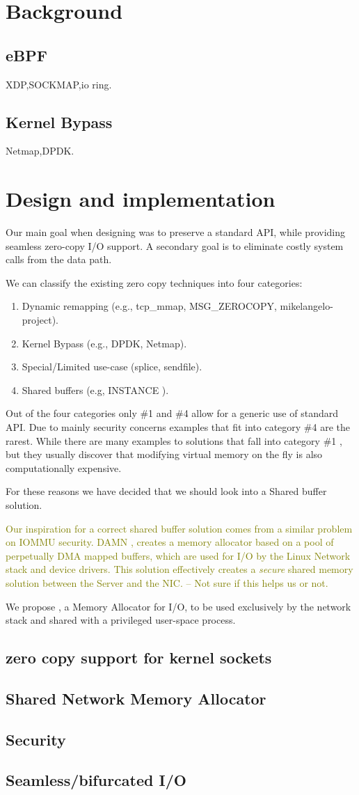\section{Background}
\subsection{eBPF}
XDP,SOCKMAP,io ring.
\subsection{Kernel Bypass}
Netmap,DPDK.

\section{Design and implementation}
Our main goal when designing \oursys was to preserve a standard \sockets API, while providing seamless zero-copy I/O support. A secondary goal is to eliminate costly system calls from the data path. 

We can classify the existing zero copy techniques into four categories:
\begin{enumerate}
    \item Dynamic remapping (e.g., tcp\_mmap, MSG\_ZEROCOPY, mikelangelo-project\cite{mikelangelo}).
    \item Kernel Bypass (e.g., DPDK, Netmap).
    \item Special/Limited use-case (splice, sendfile).
    \item Shared buffers (e.g, INSTANCE \cite{instance}).
\end{enumerate}
Out of the four categories only \#1 and \#4 allow for a generic use of standard \sockets API. Due to mainly security concerns examples that fit into category \#4 are the rarest.
While there are many examples to solutions that fall into category \#1 \cite{mikelangelo-empty,desendmsg}, but they usually discover that modifying virtual memory on the fly is also computationally expensive. 

For these reasons we have decided that we should look into a Shared buffer solution. 

\textcolor{olive}{
Our inspiration for a correct shared buffer solution comes from a similar problem on IOMMU security. DAMN \cite{markuze2018damn}, creates a memory allocator based on a pool of perpetually DMA mapped buffers, which are used for I/O by the Linux Network stack and device drivers. This solution effectively creates a \emph{secure} shared memory solution between the Server and the NIC. -- Not sure if this helps us or not.} 

We propose \oursys, a Memory Allocator for I/O, to be used exclusively by the network stack and shared with a privileged user-space process.  

\subsection{zero copy support for kernel sockets}
\subsection{Shared Network Memory Allocator}
\subsection{Security}
\subsection{Seamless/bifurcated I/O}